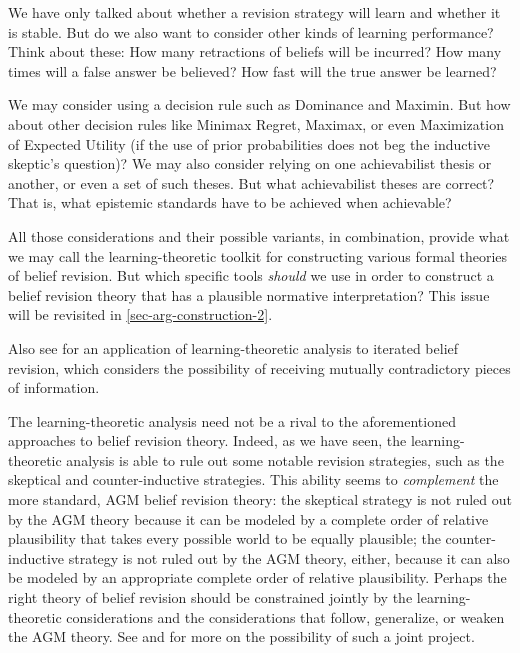 	
		We have only talked about whether a revision strategy will learn and whether it is stable. But do we also want to consider other kinds of learning performance? Think about these: How many retractions of beliefs will be incurred? How many times will a false answer be believed? How fast will the true answer be learned?

	
		We may consider using a decision rule such as Dominance and Maximin. But how about other decision rules like Minimax Regret, Maximax, or even Maximization of Expected Utility (if the use of prior probabilities does not beg the inductive skeptic's question)? We may also consider relying on one achievabilist thesis or another, or even a set of such theses. But what achievabilist theses are correct? That is, what epistemic standards have to be achieved when achievable?

\ed All those considerations and their possible variants, in combination, provide what we may call the learning-theoretic toolkit for constructing various formal theories of belief revision. But which specific tools {\em should} we use in order to construct a belief revision theory that has a plausible normative interpretation? This issue will be revisited in \autoref{sec-arg-construction-2}.


Also see \citet{kelly1999iterated} for an application of learning-theoretic analysis to iterated belief revision, which considers the possibility of receiving mutually contradictory pieces of information.

The learning-theoretic analysis need not be a rival to the aforementioned approaches to belief revision theory. Indeed, as we have seen, the learning-theoretic analysis is able to rule out some notable revision strategies, such as the skeptical and counter-inductive strategies. This ability seems to {\em complement} the more standard, AGM belief revision theory: the skeptical strategy is not ruled out by the AGM theory because it can be modeled by a complete order of relative plausibility that takes every possible world to be equally plausible; the counter-inductive strategy is not ruled out by the AGM theory, either, because it can also be modeled by an appropriate complete order of relative plausibility. Perhaps the right theory of belief revision should be constrained jointly by the learning-theoretic considerations and the considerations that follow, generalize, or weaken the AGM theory. See \citet{baltag2016solvability} and \citet{genin2015theory} for more on the possibility of such a joint project.


